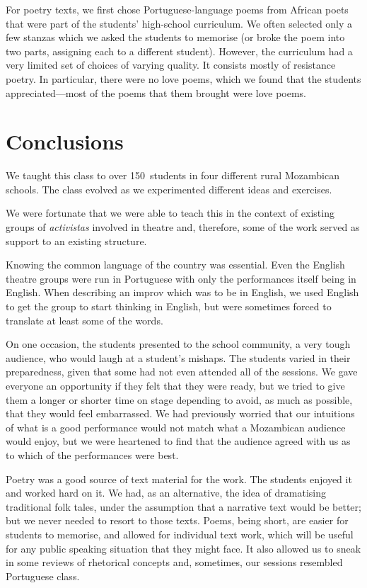 \documentclass[article,twocolumn,twoside]{memoir}
\begin{document}
For poetry texts, we first chose Portuguese-language poems from African poets
that were part of the students' high-school curriculum. We often selected only
a few stanzas which we asked the students to memorise (or broke the poem into
two parts, assigning each to a different student). However, the curriculum had
a very limited set of choices of varying quality. It consists mostly of
resistance poetry. In particular, there were no love poems, which we found that
the students appreciated---most of the poems that them brought were love poems.

\chapter{Conclusions}

We taught this class to over 150~students in four different rural Mozambican
schools. The class evolved as we experimented different ideas and exercises.

We were fortunate that we were able to teach this in the context of existing
groups of \textit{activistas} involved in theatre and, therefore, some of the
work served as support to an existing structure.

Knowing the common language of the country was essential. Even the English
theatre groups were run in Portuguese with only the performances itself being
in English. When describing an improv which was to be in English, we used
English to get the group to start thinking in English, but were sometimes
forced to translate at least some of the words.

On one occasion, the students presented to the school community, a very tough
audience, who would laugh at a student's mishaps. The students varied in their
preparedness, given that some had not even attended all of the sessions. We
gave everyone an opportunity if they felt that they were ready, but we tried to
give them a longer or shorter time on stage depending to avoid, as much as
possible, that they would feel embarrassed. We had previously worried that our
intuitions of what is a good performance would not match what a Mozambican
audience would enjoy, but we were heartened to find that the audience agreed
with us as to which of the performances were best.

Poetry was a good source of text material for the work. The students enjoyed it
and worked hard on it. We had, as an alternative, the idea of dramatising
traditional folk tales, under the assumption that a narrative text would be
better; but we never needed to resort to those texts. Poems, being short, are
easier for students to memorise, and allowed for individual text work, which
will be useful for any public speaking situation that they might face. It also
allowed us to sneak in some reviews of rhetorical concepts and, sometimes, our
sessions resembled Portuguese class.
\end{document}
